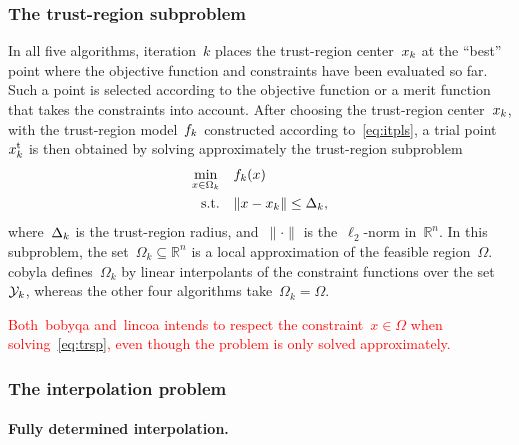 \documentclass[
    smallextended,  %
    final,        %
]{svjour3}
\newcommand{\R}{\mathbb{R}}
\newcommand{\fsetm}[1][k]{\Omega_{#1}}
\newcommand{\fset}{\Omega}
\newcommand{\iter}[1][k]{x\ifthenelse{\equal{#1}{}}{}{_{#1}}}
\newcommand{\norm}[2][]{#1\lVert#2#1\rVert}
\newcommand{\objm}[1][k]{\obj\ifthenelse{\equal{#1}{}}{}{_{#1}}}
\newcommand{\obj}{f}
\newcommand{\rad}[1][k]{\Delta\ifthenelse{\equal{#1}{}}{}{_{#1}}}
\newcommand{\st}{\text{s.t.}}
\newcommand{\trust}{{\text{t}}}
\newcommand{\xpt}[1][k]{\mathcal{Y}\ifthenelse{\equal{#1}{}}{}{_{#1}}}
\newcommand{\red}{\textcolor{red}}
\begin{document}
\subsubsection{The trust-region subproblem}

In all five algorithms, iteration~$k$ places the trust-region center~$\iter$ at the ``best'' point where the objective function and constraints have been evaluated so far.
Such a point is selected according to the objective function or a merit function that takes the constraints into account.
After choosing the trust-region center~$\iter$, with the trust-region model~$\objm$ constructed
according to~\eqref{eq:itpls}, a trial point~$\iter^{\trust}$ is then obtained by solving approximately the trust-region subproblem
\begin{equation}
    \label{eq:trsp}
    \begin{split}
        \min_{x \in \fsetm} & \quad \objm(x)\\
        \st                 & \quad \norm{x - \iter} \le \rad,
    \end{split}
\end{equation}
where~$\rad$ is the trust-region radius, and~$\norm{\cdot}$ is the~$\ell_2$-norm in~$\R^n$.
In this subproblem, the set~$\fsetm \subseteq \R^n$ is a local approximation of the feasible region~$\fset$.
\Gls{cobyla} defines~$\fsetm$ by linear interpolants of the constraint functions over the set~$\xpt$,
whereas the other four algorithms take~$\fsetm = \fset$.

\red{
Both~\gls{bobyqa} and~\gls{lincoa} intends to respect the constraint~$x\in\fset$ when
solving~\eqref{eq:trsp}, even though the problem is only solved approximately.
}

\subsubsection{The interpolation problem}
\label{ssec:iptprob}

\paragraph{\textnormal{\textbf{Fully determined interpolation.}}}
\end{document}
